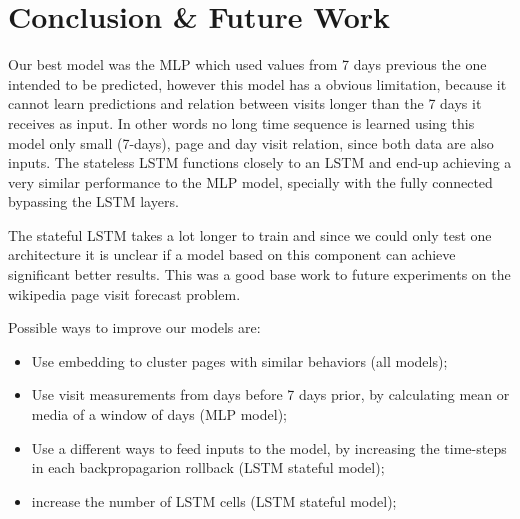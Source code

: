 \section{Conclusion \& Future Work}
\label{sec:conclusion}

Our best model was the MLP which used values from 7 days previous the one intended to be predicted,
however this model has a obvious limitation, because it cannot learn predictions and relation between visits longer than the 7 days it receives as input.
In other words no long time sequence is learned using this model only small (7-days), page and day visit relation, since both data are also inputs.
The stateless LSTM functions closely to an LSTM and end-up achieving a very similar performance to the MLP model, specially with the fully connected bypassing the LSTM layers.

The stateful LSTM takes a lot longer to train and since we could only test one architecture it is unclear if a model based on this component can achieve significant better results.
This was a good base work to future experiments on the wikipedia page visit forecast problem.

Possible ways to improve our models are:
\begin{itemize}
	\item Use embedding to cluster pages with similar behaviors (all models);
	\item Use visit measurements from days before 7 days prior, by calculating mean or media of a window of days (MLP model);
	\item Use a different ways to feed inputs to the model, by increasing the time-steps in each backpropagarion rollback (LSTM stateful model);
	\item increase the number of LSTM cells (LSTM stateful model);
\end{itemize}


